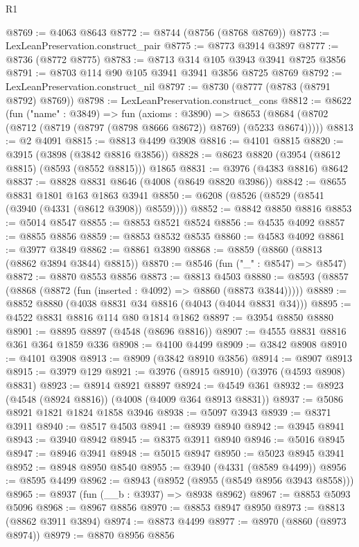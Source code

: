 \begin{lexlean}{R1}
\begin{coremodule}
@8769 := @4063 @8643
@8772 := @8744 (@8756 (@8768 @8769))
@8773 := LexLeanPreservation.construct_pair
@8775 := @8773 @3914 @3897
@8777 := @8736 (@8772 @8775)
@8783 := @8713 @314 @105 @3943 @3941 @8725 @3856
@8791 := @8703 @114 @90 @105 @3941 @3941 @3856 @8725 @8769
@8792 := LexLeanPreservation.construct_nil
@8797 := @8730 (@8777 (@8783 (@8791 @8792) @8769))
@8798 := LexLeanPreservation.construct_cons
@8812 := @8622
    (fun ("name" : @3849) =>
    fun (axioms : @3890) =>
    @8653 (@8684 (@8702 (@8712 (@8719 (@8797 (@8798 @8666 @8672)) @8769) (@5233 @8674)))))
@8813 := @2 @4091
@8815 := @8813 @4499 @3908
@8816 := @4101 @8815
@8820 := @3915 (@3898 (@3842 @8816 @3856))
@8828 := @8623 @8820 (@3954 (@8612 @8815) (@8593 (@8552 @8815))) @1865
@8831 := @3976 (@4383 @8816) @8642
@8837 := @8828 @8831 @8646 (@4008 (@8649 @8820 @3986))
@8842 := @8655 @8831 @1801 @163 @1863 @3941
@8850 := @6208 (@8526 (@8529 (@8541 (@3940 (@4331 (@8612 @3908)) @8559))))
@8852 := @8842 @8850 @8816
@8853 := @5014 @8547
@8855 := @8853 @8521 @8524
@8856 := @4535 @4092
@8857 := @8855 @8856
@8859 := @8853 @8532 @8535
@8860 := @4583 @4092
@8861 := @3977 @3849
@8862 := @8861 @3890
@8868 := @8859 (@8860 (@8813 (@8862 @3894 @3844) @8815))
@8870 := @8546 (fun ("_" : @8547) => @8547)
@8872 := @8870 @8553 @8856
@8873 := @8813 @4503
@8880 := @8593 (@8857 (@8868 (@8872 (fun (inserted : @4092) => @8860 (@8873 @3844)))))
@8889 := @8852 @8880 (@4038 @8831 @34 @8816 (@4043 (@4044 @8831 @34)))
@8895 := @4522 @8831 @8816 @114 @80 @1814 @1862
@8897 := @3954 @8850 @8880
@8901 := @8895 @8897 (@4548 (@8696 @8816))
@8907 := @4555 @8831 @8816 @361 @364 @1859 @336
@8908 := @4100 @4499
@8909 := @3842 @8908
@8910 := @4101 @3908
@8913 := @8909 (@3842 @8910 @3856)
@8914 := @8907 @8913
@8915 := @3979 @129
@8921 := @3976 (@8915 @8910) (@3976 (@4593 @8908) @8831)
@8923 := @8914 @8921 @8897
@8924 := @4549 @361
@8932 := @8923 (@4548 (@8924 @8816)) (@4008 (@4009 @364 @8913 @8831))
@8937 := @5086 @8921 @1821 @1824 @1858 @3946
@8938 := @5097 @3943
@8939 := @8371 @3911
@8940 := @8517 @4503
@8941 := @8939 @8940
@8942 := @3945 @8941
@8943 := @3940 @8942
@8945 := @8375 @3911 @8940
@8946 := @5016 @8945
@8947 := @8946 @3941
@8948 := @5015 @8947
@8950 := @5023 @8945 @3941
@8952 := @8948 @8950 @8540
@8955 := @3940 (@4331 (@8589 @4499))
@8956 := @8595 @4499
@8962 := @8943 (@8952 (@8955 (@8549 @8956 @3943 @8558)))
@8965 := @8937 (fun (__b : @3937) => @8938 @8962)
@8967 := @8853 @5093 @5096
@8968 := @8967 @8856
@8970 := @8853 @8947 @8950
@8973 := @8813 (@8862 @3911 @3894)
@8974 := @8873 @4499
@8977 := @8970 (@8860 (@8973 @8974))
@8979 := @8870 @8956 @8856

\end{coremodule}
\end{lexlean}
